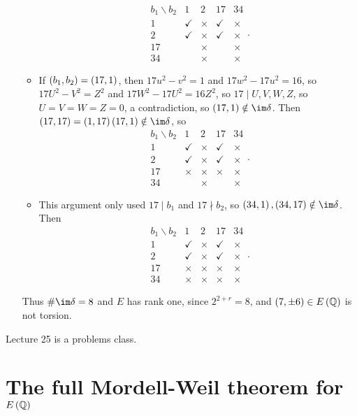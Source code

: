 \begin{example}
\begin{itemize}
\begin{itemize}
$$\begin{array}{c|cccc}
b_1 \backslash b_2 & 1 & 2 & 17 & 34 \\
\hline
1 & \checkmark & \times & \checkmark & \times \\
2 & \checkmark & \times & \checkmark & \times \\
17 & & \times & & \times \\
34 & & \times & & \times
\end{array}.
$$
\item If $ \br{b_1, b_2} = \br{17, 1} $, then $ 17u^2 - v^2 = 1 $ and $ 17w^2 - 17u^2 = 16 $, so $ 17U^2 - V^2 = Z^2 $ and $ 17W^2 - 17U^2 = 16Z^2 $, so $ 17 \mid U, V, W, Z $, so $ U = V = W = Z = 0 $, a contradiction, so $ \br{17, 1} \notin \im \delta $. Then $ \br{17, 17} = \br{1, 17}\br{17, 1} \notin \im \delta $, so
$$
\begin{array}{c|cccc}
b_1 \backslash b_2 & 1 & 2 & 17 & 34 \\
\hline
1 & \checkmark & \times & \checkmark & \times \\
2 & \checkmark & \times & \checkmark & \times \\
17 & \times & \times & \times & \times \\
34 & & \times & & \times
\end{array}.
$$
\item This argument only used $ 17 \mid b_1 $ and $ 17 \nmid b_2 $, so $ \br{34, 1}, \br{34, 17} \notin \im \delta $. Then
$$
\begin{array}{c|cccc}
b_1 \backslash b_2 & 1 & 2 & 17 & 34 \\
\hline
1 & \checkmark & \times & \checkmark & \times \\
2 & \checkmark & \times & \checkmark & \times \\
17 & \times & \times & \times & \times \\
34 & \times & \times & \times & \times
\end{array}.
$$
\end{itemize}
Thus $ \#\im \delta = 8 $ and $ E $ has rank one, since $ 2^{2 + r} = 8 $, and $ \br{7, \pm 6} \in E\br{\QQ} $ is not torsion.
\end{itemize}
\end{example}


Lecture 25 is a problems class.

\pagebreak

\section{The full Mordell-Weil theorem for \texorpdfstring{$ E\br{\QQ} $}{E(Q)}}

